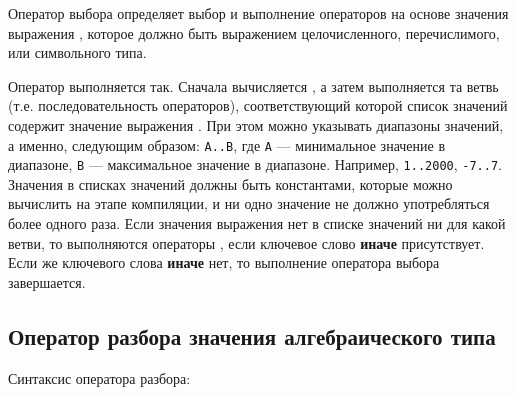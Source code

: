 \documentclass[10pt]{report}
\begin{document}
Оператор выбора определяет выбор и выполнение операторов на основе значения выражения \textcolor{Green}{}, которое должно быть выражением
целочисленного, перечислимого, или символьного типа.

Оператор выполняется так. Сначала вычисляется \textcolor{Green}{}, а затем выполняется та ветвь (т.е. последовательность операторов),
соответствующий которой список значений содержит значение выражения \textcolor{Green}{}. При этом можно указывать диапазоны значений,
а именно, следующим образом: \texttt{A..B}, где \texttt{A} --- минимальное значение в диапазоне, \texttt{B} --- максимальное значение в диапазоне. Например,
\texttt{1..2000}, \texttt{-7..7}. Значения в списках значений должны быть константами, которые можно вычислить на этапе компиляции, и ни одно значение не должно употребляться
более одного раза. Если значения выражения \textcolor{Green}{} нет в списке значений ни для какой ветви, то выполняются операторы
\textcolor{Green}{}, если ключевое слово \textbf{иначе} присутствует. Если же ключевого слова \textbf{иначе} нет, то выполнение оператора выбора
завершается.

    \subsection{Оператор разбора значения алгебраического типа}
Синтаксис оператора разбора:

\textcolor{Green}{}
\end{document}
